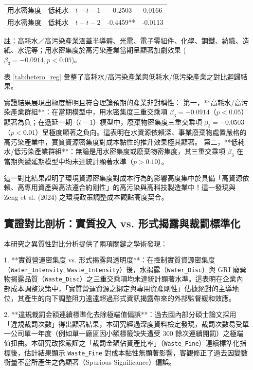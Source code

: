 \documentclass[12pt,a4paper]{article}
\begin{document}
\begin{table}[H]
\begin{threeparttable}
\begin{tabular}{llccc}
用水密集度 & 低耗水 & $t-t-1$ & -0.2503 & 0.0166 \\
用水密集度 & 低耗水 & $t-t-2$ & -0.4459** & -0.0113 \\
\bottomrule
\end{tabular}
\begin{tablenotes}
\small
\item 註：高耗水／高污染產業涵蓋半導體、光電、電子零組件、化學、鋼鐵、紡織、造紙、水泥等；用水密集度於高污染產業當期呈顯著加劇效果 ($\beta_3 = -0.0914, p < 0.05$)。
\end{tablenotes}
\end{threeparttable}
\end{table}

表 \ref{tab:hetero_reg} 彙整了高耗水/高污染產業與低耗水/低污染產業之對比迴歸結果。

實證結果展現出極度鮮明且符合理論預期的產業非對稱性：
第一，**高耗水/高污染產業群組**：在當期模型中，用水密集度三重交乘項 $\beta_3 = -0.0914$（$p < 0.05$）顯著為負；在遞延一期（$t-1$）模型中，廢棄物密集度三重交乘項 $\beta_3 = -0.0503$（$p < 0.01$）呈極度顯著之負向。這表明在水資源依賴深、事業廢棄物處置嚴格的高污染產業中，實質資源密集度對成本黏性的推升效果極其顯著。
第二，**低耗水/低污染產業群組**：無論是用水密集度或廢棄物密集度，其三重交乘項 $\beta_3$ 在當期與遞延期模型中均未達統計顯著水準（$p > 0.10$）。

這一對比結果證明了環境資源密集度對成本行為的影響高度集中於具備「高資源依賴、高專用資產與高法遵合約剛性」的高污染與高科技製造業中！這一發現與 Zeng et al. (2024) 之環境政策調整成本觀點高度契合。

\subsection{實證對比剖析：實質投入 vs. 形式揭露與裁罰標準化}

本研究之異質性對比分析提供了兩項關鍵之學術發現：

1. **實質營運密集度 vs. 形式揭露與透明度**：在控制實質資源密集度（\texttt{Water\_Intensity}, \texttt{Waste\_Intensity}）後，水揭露（\texttt{Water\_Disc}）與 GRI 廢棄物揭露品質（\texttt{Waste\_Disc}）之三重交乘項均未達統計顯著水準。這表明在企業內部成本調整決策中，「實質營運資源之綁定與專用資產剛性」佔據絕對的主導地位，其產生的向下調整阻力遠遠超過形式資訊揭露帶來的外部監督緩和效應。

2. **違規裁罰金額連續標準化去除極端值偏誤**：過去國內部分碩士論文採用「違規裁罰次數」得出顯著結果，本研究經過深度資料檢定發現，裁罰次數易受單一公司單一年度（例如單一廠區因小額標籤缺失遭受 300 餘次連續開罰）之極端值扭曲。本研究改採嚴謹之「裁罰金額佔資產比率」（\texttt{Waste\_Fine}）連續標準化指標後，估計結果顯示 \texttt{Waste\_Fine} 對成本黏性無顯著影響，客觀修正了過去因變數衡量不當所產生之偽顯著（Spurious Significance）偏誤。
\end{document}
